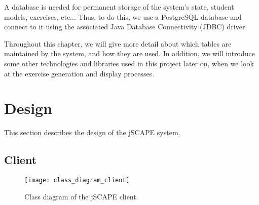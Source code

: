 A database is needed for permanent storage of the system's state, student models, exercises, etc... Thus, to do this, we use a PostgreSQL database and connect to it using the associated Java Database Connectivity (JDBC) driver. \newline

Throughout this chapter, we will give more detail about which tables are maintained by the system, and how they are used. In addition, we will introduce some other technologies and libraries used in this project later on, when we look at the exercise generation and display processes.
\section{Design}
This section describes the design of the jSCAPE system.

\subsection{Client}
\begin{figure}[H]
\centering
\texttt{[image: class\_diagram\_client]}
\caption{Class diagram of the jSCAPE client.}
\label{fig:class_diagram_client}
\end{figure}


